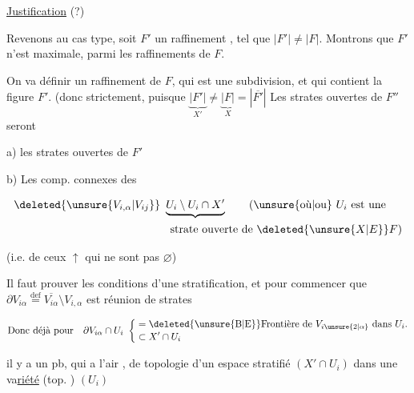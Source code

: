 
\uline{Justification} (?)


Revenons au cas type, soit $F'$ un raffinement , tel que $|F'|\neq|F|$. Montrons que $F'$ n'est  maximale,  parmi les raffinements de $F$.

On va définir un raffinement   de $F$, qui est  une subdivision, et qui contient la figure $F'$. (donc strictement, puisque $\underbrace{|F'|}_{X'}\neq\underbrace{|F|}_{X}=|\overline{F'}|$ Les  strates ouvertes de $F''$ seront

a) les strates ouvertes  de $F'$

b) Les comp. connexes  des

\[
\begin{aligned}
&\deleted{\unsure{V_{i,\alpha}|V_{ij}}}\ \underbrace{U_i\setminus U_i\cap X'}\qquad \text{(\unsure{où|ou} } U_i \text{ est une}\\
&\hspace{14em}\text{strate ouverte de } \deleted{\unsure{X|E}}F\text{)}
\end{aligned}
\]

(i.e. de  ceux $\uparrow$ qui ne sont pas $\varnothing$)

 Il faut prouver les conditions d'une stratification, et pour commencer que $\partial V_{i\alpha}\overset{\mathrm{def}}{=}\overline{V_{i\alpha}}\setminus V_{i,\alpha}$ est réunion de strates

\[
\text{Donc déjà pour}\quad \partial V_{i\alpha}\cap U_i\ \left\{\begin{aligned}&=\text{\deleted{\unsure{B|E}}Frontière de } V_{i\unsure{2|\alpha}}\text{ dans }U_i\text{.}\\[-2pt]&\subset X'\cap U_i\end{aligned}\right.
\]

il y a un pb, qui a l'air , de topologie d'un espace stratifié $(X'\cap U_i)$  dans une va\uline{riété} (top.  ) $(U_i)$
